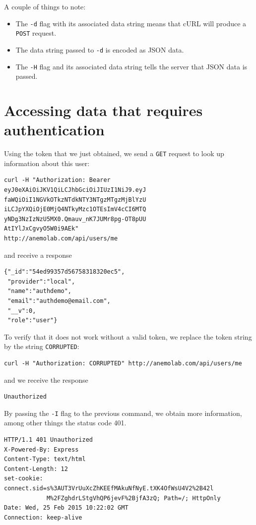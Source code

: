 \documentclass{article}
\begin{document}
A couple of things to note:
\begin{itemize}
\item The \texttt{-d} flag with its associated data string means that cURL will produce a \texttt{POST} request.
\item The data string passed to \texttt{-d} is encoded as JSON data.
\item The \texttt{-H} flag and its associated data string tells the server that JSON data is passed.
\end{itemize}
\section{Accessing data that requires authentication}
Using the token that we just obtained, we send a \texttt{GET} request to look up information about this user:
\begin{verbatim}
curl -H "Authorization: Bearer 
eyJ0eXAiOiJKV1QiLCJhbGciOiJIUzI1NiJ9.eyJ
faWQiOiI1NGVkOTkzNTdkNTY3NTgzMTgzMjBlYzU
iLCJpYXQiOjE0MjQ4NTkyMzc1OTEsImV4cCI6MTQ
yNDg3NzIzNzU5MX0.Qmauv_nK7JUMr8pg-OT8pUU
AtIYlJxCgvyO5W0i9AEk" 
http://anemolab.com/api/users/me
\end{verbatim}
and receive a response
\begin{verbatim}
{"_id":"54ed99357d56758318320ec5",
 "provider":"local",
 "name":"authdemo",
 "email":"authdemo@email.com",
 "__v":0,
 "role":"user"}
\end{verbatim}
To verify that it does not work without a valid token, we replace the token string by the string \texttt{CORRUPTED}:
\begin{verbatim}
curl -H "Authorization: CORRUPTED" http://anemolab.com/api/users/me
\end{verbatim}
and we receive the response
\begin{verbatim}
Unauthorized
\end{verbatim}
By passing the \texttt{-I} flag to the previous command, we obtain more information, among other things the status code 401.
\begin{verbatim}
HTTP/1.1 401 Unauthorized
X-Powered-By: Express
Content-Type: text/html
Content-Length: 12
set-cookie: connect.sid=s%3AUT3VrUuXcZhKEEfMAkuNfNyE.tXK4OfWsU4V2%2B42l
            M%2FZghdrLStgVhQP6jevF%2BjfA3zQ; Path=/; HttpOnly
Date: Wed, 25 Feb 2015 10:22:02 GMT
Connection: keep-alive
\end{verbatim}
\end{document}
